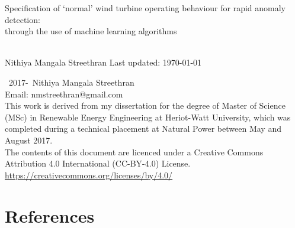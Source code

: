 \documentclass[twoside,12pt,openany]{book}
\def\theauthor{Nithiya Mangala Streethran}
\def\thetitle{%
  Specification of \texorpdfstring{`}{'}normal' wind turbine operating
  behaviour for rapid anomaly detection:\texorpdfstring{\\}{}
  through the use of machine learning algorithms%
}
\begin{document}

\frontmatter

\begin{titlepage}
  \hspace{0pt}\vfill %
  \centering %
  \Large\thetitle
  \\[4cm]
  \large\theauthor
  \vfill
  Last updated: \today
  \vfill\hspace{0pt} %
\end{titlepage}

{\setlength{\parindent}{0pt}
\hspace{0pt}\vfill
\textcopyright~2017-\the\year{}~\theauthor
\\[.5cm]
Email: nmstreethran@gmail.com
\\[.5cm]
This work is derived from my dissertation for the degree of Master of Science
(MSc) in Renewable Energy Engineering at Heriot-Watt University, which was
completed during a technical placement at Natural Power between May and
August 2017.
\\[.5cm]
The contents of this document are licenced under a
Creative Commons Attribution 4.0 International (CC-BY-4.0) License. \\
\url{https://creativecommons.org/licenses/by/4.0/}
\vfill\hspace{0pt}
}

\onehalfspacing



\tableofcontents
\listoffigures
\listoftables



\themainmatter







{%
  \backmatter%
  \chapter{References}%
  \printbibliography[heading=none]%
}

\theappendix


\end{document}
